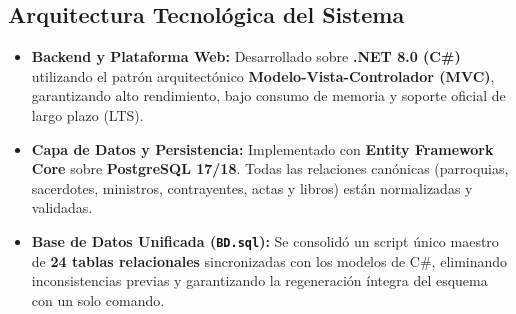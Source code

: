\documentclass[11pt,a4paper]{article}
\begin{document}
\subsection{Arquitectura Tecnológica del Sistema}
\begin{itemize}[leftmargin=1.2cm]
    \item \textbf{Backend y Plataforma Web:} Desarrollado sobre \textbf{.NET 8.0 (C\#)} utilizando el patrón arquitectónico \textbf{Modelo-Vista-Controlador (MVC)}, garantizando alto rendimiento, bajo consumo de memoria y soporte oficial de largo plazo (LTS).
    \item \textbf{Capa de Datos y Persistencia:} Implementado con \textbf{Entity Framework Core} sobre \textbf{PostgreSQL 17/18}. Todas las relaciones canónicas (parroquias, sacerdotes, ministros, contrayentes, actas y libros) están normalizadas y validadas.
    \item \textbf{Base de Datos Unificada (\texttt{BD.sql}):} Se consolidó un script único maestro de \textbf{24 tablas relacionales} sincronizadas con los modelos de C\#, eliminando inconsistencias previas y garantizando la regeneración íntegra del esquema con un solo comando.
\end{itemize}
\end{document}
